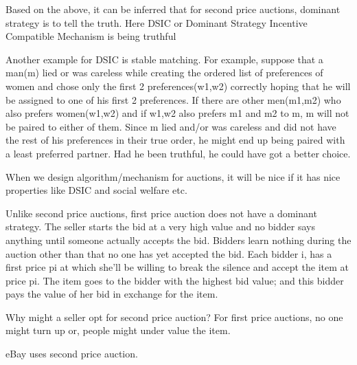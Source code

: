 \documentclass[twoside]{article}
\begin{document}
Based on the above, it can be inferred that for second price auctions, dominant strategy is to tell the truth. Here DSIC or Dominant Strategy Incentive Compatible Mechanism is being truthful

Another example for DSIC is stable matching. For example, suppose that a man(m) lied or was careless while creating the ordered list of preferences of women and chose only the first 2 preferences(w1,w2) correctly hoping that he will be assigned to one of his first 2 preferences. If there are other men(m1,m2) who also prefers women(w1,w2) and if w1,w2 also prefers m1 and m2 to m, m will not be paired to either of them. Since m lied and/or was careless and did not have the rest of his preferences in their true order, he might end up being paired with a least preferred partner. Had he been truthful, he could have got a better choice. 

When we design algorithm/mechanism for auctions, it will be nice if it has nice properties like DSIC and social welfare etc.

Unlike second price auctions, first price auction does not have a dominant strategy. The seller starts the bid at a very high value and no bidder says anything until someone actually accepts the bid. Bidders learn nothing during the auction other than that no one has yet accepted the bid. Each bidder i, has a first price pi at which she'll be willing to break the silence and accept the item at price pi. The item goes to the bidder with the highest bid value; and this bidder pays the value of her bid in exchange for the item. 

Why might a seller opt for second price auction?
For first price auctions, no one might turn up or, people might under value the item.

eBay uses second price auction.
\end{document}
